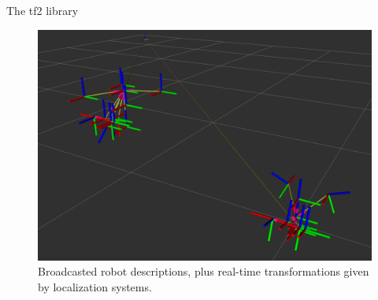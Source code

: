 \begin{frame}{The tf2 library}
	\begin{figure}
		\centering
		\includegraphics[width=.58\textwidth]{tfs}
		\caption{Broadcasted robot descriptions, plus real-time transformations given by localization systems.}
		\label{fig:tfs}
	\end{figure}
\end{frame}
